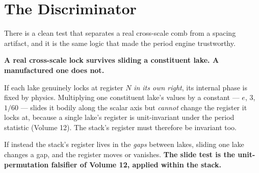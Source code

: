 \documentclass[11pt, letterpaper, openany]{book}
\begin{document}
\section{The Discriminator}

There is a clean test that separates a real cross-scale comb from a spacing artifact, and it is the
same logic that made the period engine trustworthy.

\begin{signalbox}
\textbf{A real cross-scale lock survives sliding a constituent lake. A manufactured one does not.}

\medskip
\noindent If each lake genuinely locks at register $N$ \emph{in its own right}, its internal phase
is fixed by physics. Multiplying one constituent lake's values by a constant --- $e$, $3$, $1/60$
--- slides it bodily along the scalar axis but \emph{cannot} change the register it locks at,
because a single lake's register is unit-invariant under the period statistic (Volume 12). The
stack's register must therefore be invariant too.

\medskip
\noindent If instead the stack's register lives in the \emph{gaps} between lakes, sliding one lake
changes a gap, and the register moves or vanishes. \textbf{The slide test is the unit-permutation
falsifier of Volume 12, applied within the stack.}
\end{signalbox}
\end{document}

